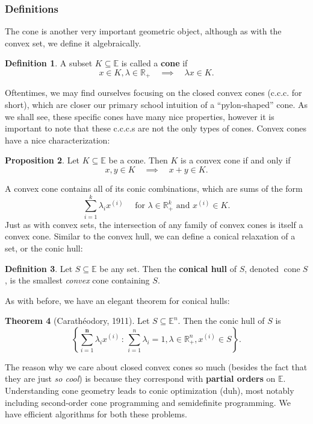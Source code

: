 \documentclass[11pt]{article}
\numberwithin{equation}{section}
\theoremstyle{definition}
\newtheorem{theorem}{Theorem}[section]
\newtheorem{proposition}[theorem]{Proposition}
\newtheorem{definition}[theorem]{Definition}%
\newcommand{\bE}{\mathbb{E}}
\newcommand{\bR}{\mathbb{R}}
\newcommand{\AND}{\text{ and }}
\newcommand{\FOR}{\text{ for }}
\newcommand{\set}[2]{\left\{#1\,:\,#2\right\}}
\newcommand{\cone}{\operatorname{cone}}
\begin{document}
\subsubsection{Definitions}
The cone is another very important geometric object, although as with the convex set, we define it algebraically.
\begin{definition}
    A subset $K\subseteq\bE$ is called a \textbf{cone} if
    \begin{equation}
        x\in K, \lambda\in\bR_+\quad\implies\quad \lambda x\in K.
    \end{equation}
\end{definition}
Oftentimes, we may find ourselves focusing on the closed convex cones (c.c.c. for short), which are closer our primary school intuition of a ``pylon-shaped'' cone. As we shall see, these specific cones have many nice properties, however it is important to note that these c.c.c.s are not the only types of cones. Convex cones have a nice characterization:
\begin{proposition}
    Let $K\subseteq\bE$ be a cone. Then $K$ is a convex cone if and only if
    \begin{equation}
        x, y\in K\quad\implies\quad x+y\in K.
    \end{equation}
\end{proposition}
A convex cone contains all of its conic combinations, which are sums of the form
\begin{equation}
    \sum_{i=1}^k\lambda_ix^{(i)}
\quad\FOR \lambda\in\bR^k_+ \AND x^{(i)}\in K.
\end{equation}
Just as with convex sets, the intersection of any family of convex cones is itself a convex cone. Similar to the convex hull, we can define a conical relaxation of a set, or the conic hull:
\begin{definition}
    Let $S\subseteq\bE$ be any set. Then the \textbf{conical hull} of $S$, denoted $\cone S$, is the smallest \textit{convex} cone containing $S$.
\end{definition}
As with before, we have an elegant theorem for conical hulls:
\begin{theorem}[Carath\'eodory, 1911]
    \label{thmcaratheodory2}%
    Let $S\subseteq\bE^n$. Then the conic hull of $S$ is
    \begin{equation}
        \label{thmcaratheodory2eq}
        \set{\sum_{i=1}^{\mathbf{n}}\lambda_ix^{(i)}}{ \sum_{i=1}^{n}\lambda_i=1, \lambda\in \bR_+^{n}, x^{(i)}\in S}.
    \end{equation}
\end{theorem}
The reason why we care about closed convex cones so much (besides the fact that they are just \textit{so cool}) is because they correspond with \textbf{partial orders} on $\bE$. Understanding cone geometry leads to conic optimization (duh), most notably including second-order cone programming and semidefinite programming. We have efficient algorithms for both these problems.
\end{document}
